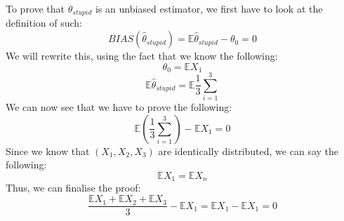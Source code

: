 To prove that $\hat{\theta}_{stupid}$ is an unbiased estimator, we first have to look at the definition of such:
$$
BIAS(\hat{\theta}_{stupid}) = \mathbb{E}\hat{\theta}_{stupid} - \theta_0 = 0
$$
We will rewrite this, using the fact that we know the following: 
$$
\theta_0 = \mathbb{E}X_1
$$
$$
\mathbb{E}\hat{\theta}_{stupid} = \mathbb{E}\frac{1}{3} \sum_{i=1}^3
$$
We can now see that we have to prove the following:
$$
\mathbb{E}\left(\frac{1}{3} \sum_{i=1}^3\right) - \mathbb{E}X_1 = 0
$$
Since we know that $(X_1, X_2, X_3)$ are identically distributed, we can say the following:
$$
\mathbb{E}X_1 = \mathbb{E}X_n
$$
Thus, we can finalise the proof:
$$
\frac{\mathbb{E}X_1 + \mathbb{E}X_2 + \mathbb{E}X_3}{3} - \mathbb{E}X_1 = \mathbb{E}X_1 - \mathbb{E}X_1 = 0
$$